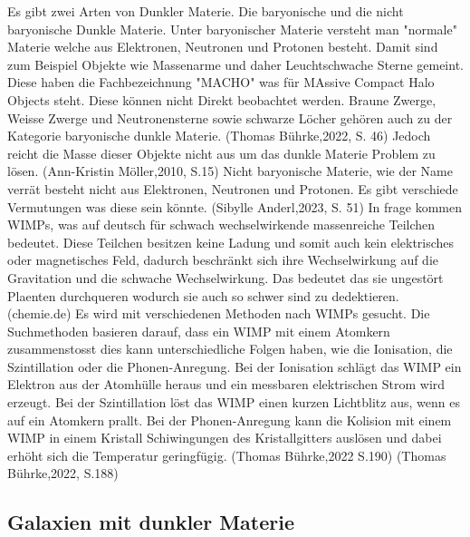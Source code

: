 Es gibt zwei Arten von Dunkler Materie. Die baryonische und die nicht baryonische Dunkle
Materie. Unter baryonischer Materie versteht man "normale" Materie welche aus Elektronen, Neutronen 
und Protonen besteht. Damit sind zum Beispiel Objekte wie Massenarme und daher Leuchtschwache Sterne
gemeint. Diese haben die Fachbezeichnung "MACHO" was für MAssive Compact Halo Objects steht. Diese können
nicht Direkt beobachtet werden. Braune Zwerge, Weisse Zwerge und Neutronensterne sowie schwarze Löcher gehören auch zu der Kategorie 
baryonische dunkle Materie. (Thomas Bührke,2022, S. 46) Jedoch reicht die Masse dieser Objekte nicht aus um das dunkle Materie Problem zu lösen. (Ann-Kristin Möller,2010, S.15) 
Nicht baryonische Materie, wie der Name verrät besteht nicht aus Elektronen, Neutronen und Protonen. Es gibt
verschiede Vermutungen was diese sein könnte. (Sibylle Anderl,2023, S. 51) 
In frage kommen WIMPs, was auf deutsch für schwach wechselwirkende massenreiche Teilchen bedeutet. Diese Teilchen besitzen keine Ladung und somit auch kein elektrisches oder magnetisches Feld, dadurch beschränkt sich ihre 
Wechselwirkung auf die Gravitation und die schwache Wechselwirkung. Das bedeutet das sie ungestört Plaenten durchqueren wodurch sie auch so schwer sind zu dedektieren. (chemie.de)
Es wird mit verschiedenen Methoden nach WIMPs gesucht. Die Suchmethoden basieren darauf, dass ein WIMP mit einem Atomkern zusammenstosst dies kann unterschiedliche Folgen haben, wie die Ionisation, die Szintillation oder die Phonen-Anregung.
Bei der Ionisation schlägt das WIMP ein Elektron aus der Atomhülle heraus und ein messbaren elektrischen Strom wird erzeugt. Bei der Szintillation löst das WIMP einen kurzen Lichtblitz aus,
wenn es auf ein Atomkern prallt. Bei der Phonen-Anregung kann die Kolision mit einem WIMP in einem Kristall Schiwingungen des Kristallgitters auslösen und dabei erhöht sich die Temperatur geringfügig. (Thomas Bührke,2022 S.190)
(Thomas Bührke,2022, S.188)

\subsection{Galaxien mit dunkler Materie}